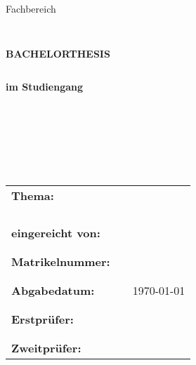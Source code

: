 \begin{titlepage}
	\begin{center}
		\myUni\\
	\end{center}
	\begin{center}
		\large Fachbereich \myDepartment
	\end{center}
	\begin{verbatim}


	\end{verbatim}
	\begin{center}
		\uppercase{\textbf{\large Bachelorthesis}}
	\end{center}
	\begin{verbatim}
	\end{verbatim}
	\begin{center}
		\textbf{im Studiengang \myMajor}
	\end{center}
	\begin{verbatim}







	\end{verbatim}
	\begin{flushleft}
		\begin{tabular}{lll}
			\textbf{Thema:} & & \myTitle \\
			&&  \myTitleSecondLine \\
			& & \\
			& & \\
			& & \\
			\textbf{eingereicht von:} & & \myName\ \myEMail\\
			& & \\
			& & \\
			\textbf{Matrikelnummer:} & & \myMatricleNumber\\
			& & \\
			& & \\
			\textbf{Abgabedatum:} & & \today\\
			& & \\
			& & \\
			\textbf{Erstprüfer:} & & \myProf\\
			& & \\
			& & \\
			\textbf{Zweitprüfer:} & & \myOtherProf
		\end{tabular}
	\end{flushleft}
\end{titlepage}
